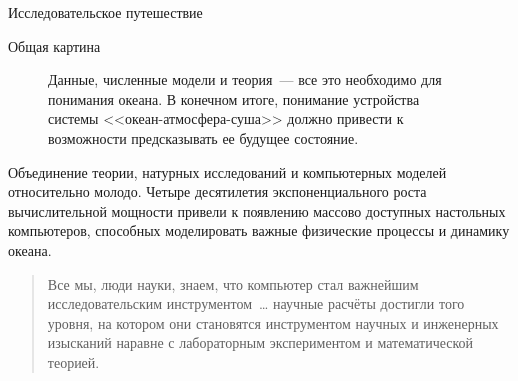 \begin{chapter}{Исследовательское путешествие}
\begin{section}{Общая картина}
\begin{figure}[h!]
\caption{Данные, численные модели и теория~--- все это необходимо для
понимания океана. В конечном итоге, понимание устройства системы 
<<океан-атмосфера-суша>> должно привести к возможности предсказывать 
ее будущее состояние.}
\label{fig:bigpicture}
\end{figure}
%
% 


Объединение теории, натурных исследований и компьютерных моделей относительно 
молодо. Четыре десятилетия экспоненциального роста вычислительной мощности
привели к появлению массово доступных настольных компьютеров, способных 
моделировать важные физические процессы и динамику океана.
%

\begin{quotation}
Все мы, люди науки, знаем, что компьютер стал важнейшим исследовательским 
инструментом~\dots{} научные расчёты достигли того уровня, на котором 
они становятся инструментом научных и инженерных изысканий наравне
с лабораторным экспериментом и математической теорией.~\cite{Langer:1999}
%
\end{quotation}


\end{section}
\end{chapter}
